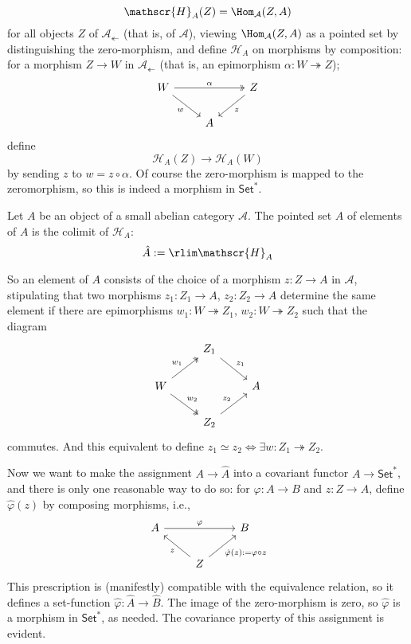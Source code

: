\[\mathscr{H}_A(Z)=\Hom_{\mathcal{A}}(Z,A)\]
for all objects $Z$ of $\mathcal{A}_{\twoheadleftarrow}$ (that is, of $\mathcal{A}$), viewing $\Hom_{\mathcal{A}}(Z,A)$ as a pointed set by distinguishing the zero-morphism, and define $\mathscr{H}_A$ on morphisms by composition: for a morphism $Z\to W$ in $\mathcal{A}_{\twoheadleftarrow}$ (that is, an epimorphism $\alpha:W\twoheadrightarrow Z$);
\[\begin{tikzcd}
W\ar[rd,swap,"w"]\ar[rr,twoheadrightarrow,"\alpha"]&&Z\ar[ld,"z"]\\
&A&
\end{tikzcd}\]
define
\[\mathscr{H}_A(Z)\to\mathscr{H}_A(W)\]
by sending $z$ to $w=z\circ\alpha$. Of course the zero-morphism is mapped to the zeromorphism, so this is indeed a morphism in $\mathsf{Set}^*$.
\begin{definition}
Let $A$ be an object of a small abelian category $\mathcal{A}$. The pointed set $\hat{A}$ of elements of $A$ is the colimit of $\mathscr{H}_A$:
\[\hat{A}:=\rlim\mathscr{H}_A\]
\end{definition}
So an element of $A$ consists of the choice of a morphism $z:Z\to A$ in $\mathcal{A}$, stipulating that two morphisms $z_1:Z_1\to A$, $z_2:Z_2\to A$ determine the same element if
there are epimorphisms $w_1:W\twoheadrightarrow Z_1$, $w_2:W\twoheadrightarrow Z_2$ such that the diagram
\[\begin{tikzcd}
&Z_1\ar[rd,"z_1"]&\\
W\ar[ru,twoheadrightarrow,"w_1"]\ar[rd,twoheadrightarrow,"w_2"]&&A\\
&Z_2\ar[ru,"z_2"]
\end{tikzcd}\]
commutes. And this equivalent to define $z_1\simeq z_2\iff\exists w:Z_1\twoheadrightarrow Z_2$. \par
Now we want to make the assignment $A\to\hat{A}$ into a covariant functor $A\to\mathsf{Set}^*$, and there is only one reasonable way to do so: for $\varphi:A\to B$ and $z:Z\to A$, define $\hat{\varphi}(z)$ by composing morphisms, i.e.,
\[\begin{tikzcd}
A\ar[rr,"\varphi"]&&B\\
&Z\ar[lu,"z"]\ar[ru,swap,"\hat{\varphi}(z):=\varphi\circ z"]&
\end{tikzcd}\]
This prescription is (manifestly) compatible with the equivalence relation, so it defines a set-function $\hat{\varphi}:\hat{A}\to\hat{B}$. The image of the zero-morphism is zero, so $\hat{\varphi}$ is a morphism in $\mathsf{Set}^*$, as needed. The covariance property of this assignment is evident.\par
